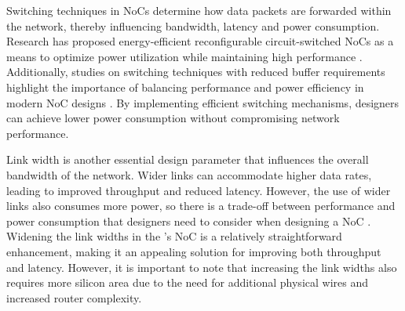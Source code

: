 Switching techniques in NoCs determine how data packets are forwarded within the network, thereby influencing bandwidth, latency and power consumption.
Research has proposed energy-efficient reconfigurable circuit-switched NoCs as a means to optimize power utilization while maintaining high performance \cite{wolkotteEnergyEfficientReconfigurableCircuitSwitched2005}.
Additionally, studies on switching techniques with reduced buffer requirements highlight the importance of balancing performance and power efficiency in modern NoC designs \cite{requenaEfficientSwitchingTechnique2008}.
By implementing efficient switching mechanisms, designers can achieve lower power consumption without compromising network performance.

Link width is another essential design parameter that influences the overall bandwidth of the network.
Wider links can accommodate higher data rates, leading to improved throughput and reduced latency.
However, the use of wider links also consumes more power, so there is a trade-off between performance and power consumption that designers need to consider when designing a NoC \cite{manhokimNetworkonchipLinkAnalysis2006}.
Widening the link widths in the \graicore{}'s NoC is a relatively straightforward enhancement, making it an appealing solution for improving both throughput and latency.
However, it is important to note that increasing the link widths also requires more silicon area due to the need for additional physical wires and increased router complexity.
